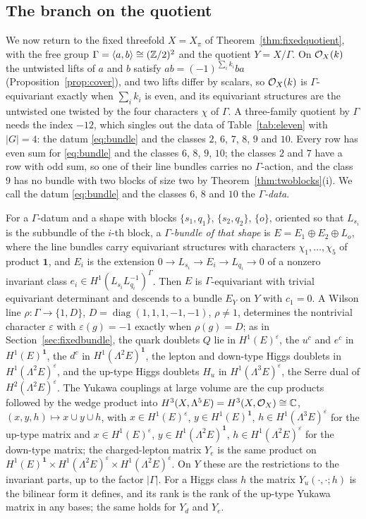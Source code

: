 \subsection{The branch on the quotient}\label{sec:gammabranch}
We now return to the fixed threefold $X=X_\pi$ of
Theorem~\ref{thm:fixedquotient}, with the free group $\Gamma=\langle
a,b\rangle\cong(\mathbb{Z}/2)^2$ and the quotient $Y=X/\Gamma$. On $\mathcal{O}_X(k)$ the
untwisted lifts of $a$ and $b$ satisfy $ab=(-1)^{\sum_ik_i}ba$
(Proposition~\ref{prop:cover}), and two lifts differ by scalars, so
$\mathcal{O}_X(k)$ is $\Gamma$-equivariant exactly when $\sum_ik_i$ is even, and
its equivariant structures are the untwisted one twisted by the four
characters $\chi$ of $\Gamma$. A three-family quotient by $\Gamma$ needs
the index $-12$, which singles out the data of Table~\ref{tab:eleven} with
$|G|=4$: the datum \eqref{eq:bundle} and the classes $2$, $6$, $7$, $8$, $9$
and $10$. Every row has even sum for \eqref{eq:bundle} and the classes $6$,
$8$, $9$, $10$; the classes $2$ and $7$ have a row with odd sum, so one of
their line bundles carries no $\Gamma$-action, and the class $9$ has no
bundle with two blocks of size two by Theorem~\ref{thm:twoblocks}(i). We
call the datum \eqref{eq:bundle} and the classes $6$, $8$ and $10$ the
\emph{$\Gamma$-data}.

For a $\Gamma$-datum and a shape with blocks $\{s_1,q_1\}$, $\{s_2,q_2\}$,
$\{o\}$, oriented so that $L_{s_i}$ is the subbundle of the $i$-th block, a
\emph{$\Gamma$-bundle of that shape} is $E=E_1\oplus E_2\oplus L_o$, where
the line bundles carry equivariant structures with characters
$\chi_1,\dots,\chi_5$ of product $\mathbf 1$, and $E_i$ is the extension
$0\to L_{s_i}\to E_i\to L_{q_i}\to0$ of a nonzero invariant class
$e_i\in H^1(L_{s_i}L_{q_i}^{-1})^\Gamma$. Then $E$ is $\Gamma$-equivariant
with trivial equivariant determinant and descends to a bundle $E_Y$ on $Y$
with $c_1=0$. A Wilson line $\rho\colon\Gamma\to\{1,D\}$,
$D=\operatorname{diag}(1,1,1,-1,-1)$, $\rho\ne1$, determines the nontrivial
character $\varepsilon$ with $\varepsilon(g)=-1$ exactly when $\rho(g)=D$;
as in Section~\ref{sec:fixedbundle}, the quark doublets $Q$ lie in
$H^1(E)^\varepsilon$, the $u^c$ and $e^c$ in $H^1(E)^{\mathbf1}$, the
$d^c$ in $H^1(\Lambda^2E)^{\mathbf1}$, the lepton and down-type Higgs
doublets in $H^1(\Lambda^2E)^\varepsilon$, and the up-type Higgs doublets
$H_u$ in $H^1(\Lambda^3E)^\varepsilon$, the Serre dual of
$H^2(\Lambda^2E)^\varepsilon$. The Yukawa couplings at large volume are the
cup products followed by the wedge product into
$H^3(X,\Lambda^5E)=H^3(X,\mathcal{O}_X)\cong\mathbb{C}$, $(x,y,h)\mapsto x\cup y\cup h$,
with $x\in H^1(E)^\varepsilon$, $y\in H^1(E)^{\mathbf1}$,
$h\in H^1(\Lambda^3E)^\varepsilon$ for the up-type matrix and
$x\in H^1(E)^\varepsilon$, $y\in H^1(\Lambda^2E)^{\mathbf1}$,
$h\in H^1(\Lambda^2E)^\varepsilon$ for the down-type matrix; the
charged-lepton matrix $Y_e$ is the same product on
$H^1(E)^{\mathbf1}\times H^1(\Lambda^2E)^\varepsilon\times
H^1(\Lambda^2E)^\varepsilon$. On $Y$ these are the restrictions to the
invariant parts, up to the factor $|\Gamma|$. For a Higgs class $h$ the
matrix $Y_u(\cdot,\cdot;h)$ is the bilinear form it defines, and its rank
is the rank of the up-type Yukawa matrix in any bases; the same holds for
$Y_d$ and $Y_e$.

